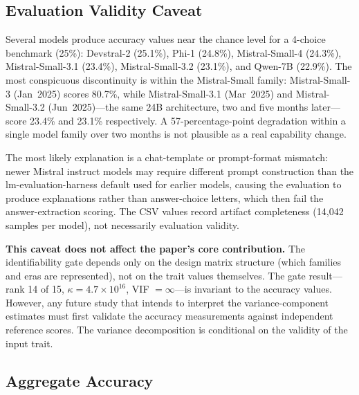 \documentclass[journal]{IEEEtran}
\begin{document}
\subsection{Evaluation Validity Caveat}

Several models produce accuracy values near the chance level for a 4-choice benchmark (25\%): Devstral-2 (25.1\%), Phi-1 (24.8\%), Mistral-Small-4 (24.3\%), Mistral-Small-3.1 (23.4\%), Mistral-Small-3.2 (23.1\%), and Qwen-7B (22.9\%). The most conspicuous discontinuity is within the Mistral-Small family: Mistral-Small-3 (Jan~2025) scores 80.7\%, while Mistral-Small-3.1 (Mar~2025) and Mistral-Small-3.2 (Jun~2025)---the same 24B architecture, two and five months later---score 23.4\% and 23.1\% respectively. A 57-percentage-point degradation within a single model family over two months is not plausible as a real capability change.

The most likely explanation is a chat-template or prompt-format mismatch: newer Mistral instruct models may require different prompt construction than the lm-evaluation-harness default used for earlier models, causing the evaluation to produce explanations rather than answer-choice letters, which then fail the answer-extraction scoring. The CSV values record artifact completeness (14,042 samples per model), not necessarily evaluation validity.

\textbf{This caveat does not affect the paper's core contribution.} The identifiability gate depends only on the design matrix structure (which families and eras are represented), not on the trait values themselves. The gate result---rank 14 of 15, $\kappa = 4.7 \times 10^{16}$, VIF $= \infty$---is invariant to the accuracy values. However, any future study that intends to interpret the variance-component estimates must first validate the accuracy measurements against independent reference scores. The variance decomposition is conditional on the validity of the input trait.

\subsection{Aggregate Accuracy}
\end{document}
